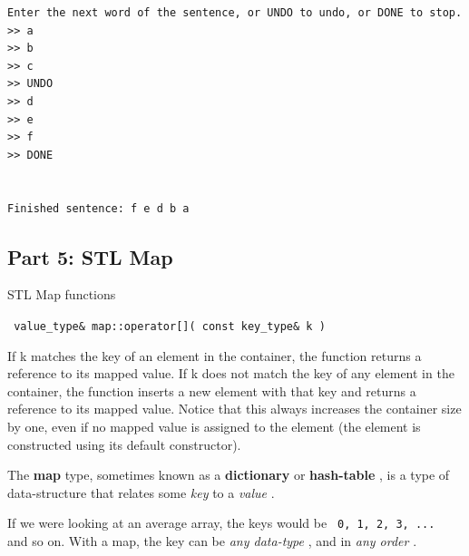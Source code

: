 \documentclass[a4paper,12pt]{book}
\begin{document}
\begin{lstlisting}[style=output]
Enter the next word of the sentence, or UNDO to undo, or DONE to stop.
>> a
>> b
>> c
>> UNDO
>> d
>> e
>> f
>> DONE


Finished sentence: f e d b a
\end{lstlisting}
            
            \newpage
            \subsection*{Part 5: STL Map}

                \begin{intro}{STL Map functions}

                    \footnotesize
                    
                    \texttt{ value\_type\& map::operator[]( const key\_type\& k ) }

                        If k matches the key of an element in the container,
                        the function returns a reference to its mapped value.
                        If k does not match the key of any element in the container,
                        the function inserts a new element with that key and returns a
                        reference to its mapped value. Notice that this always increases the container
                        size by one, even if no mapped value is assigned to the element
                        (the element is constructed using its default constructor).
                    

                    
                \end{intro}

                    The \textbf{ map } type, sometimes known as a \textbf{ dictionary }
                    or \textbf{ hash-table }, is a type of data-structure that relates
                    some \textit{ key } to a \textit{ value }.

                    If we were looking at an average array, the keys would be
                    \texttt{ 0, 1, 2, 3, ... } and so on.
                    With a map, the key can be \textit{ any data-type },
                    and in \textit{ any order }. \\
\end{document}
